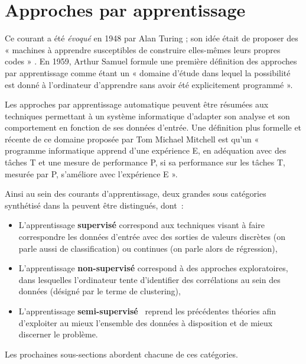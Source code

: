 \section{Approches par apprentissage}
\label{sec:machine_learning}
Ce courant a été \textit{évoqué} en 1948 par Alan Turing ; son idée était de proposer des « machines à apprendre susceptibles de construire elles-mêmes leurs propres codes » \cite{Turing1950}. En 1959, Arthur Samuel formule une première définition des approches par apprentissage comme étant un « domaine d’étude dans lequel la possibilité est donné à l’ordinateur d’apprendre sans avoir été explicitement programmé ».\par 

Les approches par apprentissage automatique peuvent être résumées aux techniques permettant à un système informatique d’adapter son analyse et son comportement en fonction de ses données d’entrée. Une définition plus formelle et récente de ce domaine proposée par Tom Michael Mitchell est qu’un « programme informatique apprend d’une expérience E, en adéquation avec des tâches T et une mesure de performance P, si sa performance sur les tâches T, mesurée par P, s’améliore avec l’expérience E ».\par

Ainsi au sein des courants d’apprentissage, deux grandes sous catégories synthétisé dans la  peuvent être distingués, dont~: 
\begin{itemize}
    \item L'apprentissage \textbf{supervisé} correspond aux techniques visant à faire correspondre les données d'entrée avec des sorties de valeurs discrètes (on parle aussi de classification) ou continues (on parle alors de régression),
    \item L'apprentissage \textbf{non-supervisé} correspond à des approches exploratoires, dans lesquelles l'ordinateur tente d'identifier des corrélations au sein des données (désigné par le terme de clustering),
    \item L'apprentissage \textbf{semi-supervisé}~\cite{Murphy2012} reprend les précédentes théories afin d'exploiter au mieux l'ensemble des données à disposition et de mieux discerner le problème.
\end{itemize}

Les prochaines sous-sections abordent chacune de ces catégories.\par
 
